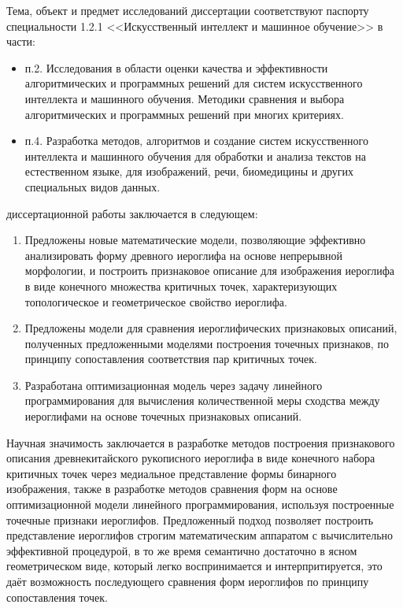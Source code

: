 {\correspondence} Тема, объект и предмет исследований диссертации соответствуют паспорту специальности 1.2.1 <<Искусственный интеллект и машинное обучение>> в части:
\begin{itemize}
    \item п.2. Исследования в области оценки качества и эффективности алгоритмических и программных решений для систем искусственного интеллекта и машинного обучения. Методики сравнения и выбора алгоритмических и программных решений при многих критериях.
    \item п.4. Разработка методов, алгоритмов и создание систем искусственного интеллекта и машинного обучения для обработки и анализа текстов на естественном языке, для изображений, речи, биомедицины и других специальных видов данных.
\end{itemize}


{\novelty} диссертационной работы заключается в следующем:
\begin{enumerate}[beginpenalty=10000] %
    \item Предложены новые математические модели, позволяющие эффективно анализировать форму древного иероглифа на основе непрерывной морфологии, и построить признаковое описание для изображения иероглифа в виде конечного множества критичных точек, характеризующих топологическое и геометрическое свойство иероглифа.
    \item Предложены модели для сравнения иероглифических признаковых описаний, полученных предложенными моделями построения точечных признаков, по принципу сопоставления соответствия пар критичных точек.
    \item Разработана оптимизационная модель через задачу линейного программирования для вычисления количественной меры сходства между иероглифами на основе точечных признаковых описаний.
\end{enumerate}

{\influence}
Научная значимость заключается в разработке методов построения признакового описания древнекитайского рукописного иероглифа в виде конечного набора критичных точек через медиальное представление формы бинарного изображения, также в разработке методов сравнения форм на основе оптимизационной модели линейного программирования, используя построенные точечные признаки иероглифов. Предложенный подход позволяет построить представление иероглифов строгим математическим аппаратом с вычислительно эффективной процедурой, в то же время семантично достаточно в ясном геометрическом виде, который легко воспринимается и интерпритируется, это даёт возможность последующего сравнения форм иероглифов по принципу сопоставления точек.

